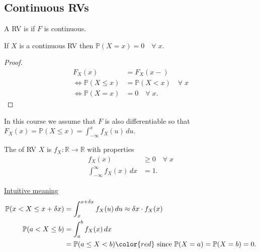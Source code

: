 \subsection{Continuous RVs}
\begin{definition}[Continuous RV]
    A RV is  if $F$ is continuous.
\end{definition} 

\begin{claim}
    If $X$ is a continuous RV then $\mathbb{P}(X = x) = 0 \quad \forall \; x$.
\end{claim} 

\begin{proof}
    \begin{align*}
        F_X(x) &= F_X(x-) \\
        \iff \mathbb{P}(X \leq x) &= \mathbb{P}(X < x) \quad \forall \; x \\
        \iff \mathbb{P}(X = x) &= 0 \quad \forall \; x.
    \end{align*} 
\end{proof} 

\begin{note}
    In this course we assume that $F$ is also differentiable so that $F_X(x) = \mathbb{P}(X \leq x) = \int_{-\infty}^{x} f_X(u) \,du$.
\end{note} 

\begin{definition}
    The  of RV $X$ is $f_X : \mathbb{R} \to \mathbb{R}$ with properties
    \begin{align*}
        f_X(x) &\geq 0 \quad \forall \; x \\
        \int_{-\infty}^{\infty} f_X(x) \,dx &= 1.
    \end{align*} 
\end{definition} 

\underline{Intuitive meaning}
\begin{align*}
    \mathbb{P}(x < X \leq x + \delta x) &= \int_{x}^{x + \delta x} f_X(u) \,du \approx \delta x \cdot f_X(x) \\
    \mathbb{P}(a < X \leq b) &= \int_{a}^{b} f_X(x) \,dx \\
    &= \mathbb{P}(a \leq X < b) \color{red} \text{ since } \mathbb{P}(X = a) = \mathbb{P}(X = b) = 0.
\end{align*} 


